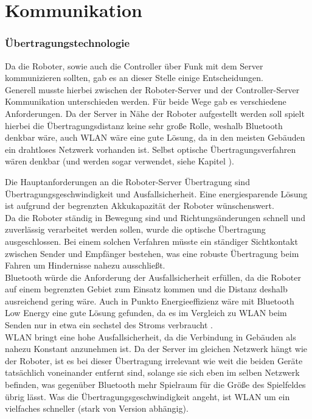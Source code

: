 \chapter{Kommunikation}
\label{sec:kommunikation}

\subsection*{Übertragungstechnologie}
Da die Roboter, sowie auch die Controller über Funk mit dem Server kommunizieren sollten, gab es an dieser Stelle einige Entscheidungen. \\
Generell musste hierbei zwischen der Roboter-Server und der Controller-Server Kommunikation unterschieden werden. Für beide Wege gab es verschiedene Anforderungen. 
Da der Server in Nähe der Roboter aufgestellt werden soll spielt hierbei die Übertragungsdistanz keine sehr große Rolle, weshalb Bluetooth denkbar wäre, auch WLAN wäre eine gute Lösung, da in den meisten Gebäuden ein drahtloses Netzwerk vorhanden ist. Selbst optische Übertragungsverfahren wären denkbar (und werden sogar verwendet, siehe Kapitel %
).

Die Hauptanforderungen an die Roboter-Server Übertragung sind Übertragungsgeschwindigkeit und Ausfallsicherheit. Eine energiesparende Lösung ist aufgrund der begrenzten Akkukapazität der Roboter wünschenswert. \\
Da die Roboter ständig in Bewegung sind und Richtungsänderungen schnell und zuverlässig verarbeitet werden sollen, wurde die optische Übertragung ausgeschlossen. Bei einem solchen Verfahren müsste ein ständiger Sichtkontakt zwischen Sender und Empfänger bestehen, was eine robuste Übertragung beim Fahren um Hindernisse nahezu ausschließt. \\
 Bluetooth würde die Anforderung der Ausfallsicherheit erfüllen, da die Roboter auf einem begrenzten Gebiet zum Einsatz kommen und die Distanz deshalb ausreichend gering wäre. Auch in Punkto Energieeffizienz wäre mit Bluetooth Low Energy eine gute Lösung gefunden, da es im Vergleich zu WLAN beim Senden nur in etwa ein sechstel des Stroms verbraucht %
. \\
WLAN bringt eine hohe Ausfallsicherheit, da die Verbindung in Gebäuden als nahezu Konstant anzunehmen ist. Da der Server im gleichen Netzwerk hängt wie der Roboter, ist es bei dieser Übertragung irrelevant wie weit die beiden Geräte tatsächlich voneinander entfernt sind, solange sie sich eben im selben Netzwerk befinden, was gegenüber Bluetooth mehr Spielraum für die Größe des Spielfeldes übrig lässt. Was die Übertragungsgeschwindigkeit angeht, ist WLAN um ein vielfaches schneller (stark von Version abhängig). \\

